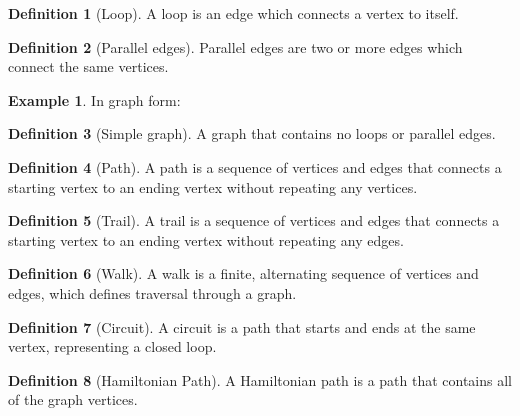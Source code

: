 \documentclass{article}
\theoremstyle{definition}
\newtheorem{definition}{Definition}[section]
\theoremstyle{definition}
\newtheorem{example}{Example}
\begin{document}
\begin{definition}[Loop]
A loop is an edge which connects a vertex to itself.
\end{definition}
\begin{definition}[Parallel edges]
    Parallel edges are two or more edges which connect the same vertices.
\end{definition}
\begin{example} In graph form: \\
\end{example}
\begin{definition}[Simple graph]
    A graph that contains no loops or parallel edges.
\end{definition}

\begin{definition}[Path]
    A path is a sequence of vertices and edges that connects a starting vertex to an ending vertex without repeating any vertices.
\end{definition}

\begin{definition}[Trail]
        A trail is a sequence of vertices and edges that connects a starting vertex to an ending vertex without repeating any edges.
\end{definition}

\begin{definition}[Walk]
    A walk is a finite, alternating sequence of vertices and edges, which defines traversal through a graph.
\end{definition}

\begin{definition}[Circuit]
    A circuit is a path that starts and ends at the same vertex, representing a closed loop.
\end{definition}

\begin{definition}[Hamiltonian Path]
    A Hamiltonian path is a path that contains all of the graph vertices.
\end{definition}
\end{document}
